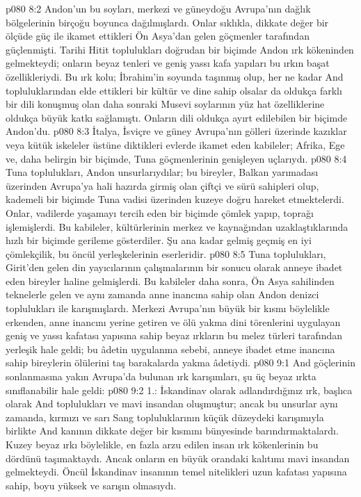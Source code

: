 \vs p080 8:2 Andon’un bu soyları, merkezi ve güneydoğu Avrupa’nın dağlık bölgelerinin birçoğu boyunca dağılmışlardı. Onlar sıklıkla, dikkate değer bir ölçüde güç ile ikamet ettikleri Ön Asya’dan gelen göçmenler tarafından güçlenmişti. Tarihi Hitit toplulukları doğrudan bir biçimde Andon ırk kökeninden gelmekteydi; onların beyaz tenleri ve geniş yassı kafa yapıları bu ırkın başat özellikleriydi. Bu ırk kolu; İbrahim’in soyunda taşınmış olup, her ne kadar And topluluklarından elde ettikleri bir kültür ve dine sahip olsalar da oldukça farklı bir dili konuşmuş olan daha sonraki Musevi soylarının yüz hat özelliklerine oldukça büyük katkı sağlamıştı. Onların dili oldukça ayırt edilebilen bir biçimde Andon’du.
\vs p080 8:3 İtalya, İsviçre ve güney Avrupa’nın gölleri üzerinde kazıklar veya kütük iskeleler üstüne diktikleri evlerde ikamet eden kabileler; Afrika, Ege ve, daha belirgin bir biçimde, Tuna göçmenlerinin genişleyen uçlarıydı.
\vs p080 8:4 Tuna toplulukları, Andon unsurlarıydılar; bu bireyler, Balkan yarımadası üzerinden Avrupa’ya hali hazırda girmiş olan çiftçi ve sürü sahipleri olup, kademeli bir biçimde Tuna vadisi üzerinden kuzeye doğru hareket etmektelerdi. Onlar, vadilerde yaşamayı tercih eden bir biçimde çömlek yapıp, toprağı işlemişlerdi. Bu kabileler, kültürlerinin merkez ve kaynağından uzaklaştıklarında hızlı bir biçimde gerileme gösterdiler. Şu ana kadar gelmiş geçmiş en iyi çömlekçilik, bu öncül yerleşkelerinin eserleridir.
\vs p080 8:5 Tuna toplulukları, Girit’den gelen din yayıcılarının çalışmalarının bir sonucu olarak anneye ibadet eden bireyler haline gelmişlerdi. Bu kabileler daha sonra, Ön Asya sahilinden teknelerle gelen ve aynı zamanda anne inancına sahip olan Andon denizci toplulukları ile karışmışlardı. Merkezi Avrupa’nın büyük bir kısmı böylelikle erkenden, anne inancını yerine getiren ve ölü yakma dini törenlerini uygulayan geniş ve yassı kafatası yapısına sahip beyaz ırkların bu melez türleri tarafından yerleşik hale geldi; bu âdetin uygulanma sebebi, anneye ibadet etme inancına sahip bireylerin ölülerini taş barakalarda yakma âdetiydi.
\vs p080 9:1 And göçlerinin sonlanmasına yakın Avrupa’da bulunan ırk karışımları, şu üç beyaz ırkta sınıflanabilir hale geldi:
\vs p080 9:2 1.: İskandinav olarak adlandırdığınız ırk, başlıca olarak And toplulukları ve mavi insandan oluşmuştur; ancak bu unsurlar aynı zamanda, kırmızı ve sarı Sang topluluklarının küçük düzeydeki karışımıyla birlikte And kanının dikkate değer bir kısmını bünyesinde barındırmaktalardı. Kuzey beyaz ırkı böylelikle, en fazla arzu edilen insan ırk kökenlerinin bu dördünü taşımaktaydı. Ancak onların en büyük orandaki kalıtımı mavi insandan gelmekteydi. Öncül İskandinav insanının temel nitelikleri uzun kafatası yapısına sahip, boyu yüksek ve sarışın olmasıydı.
